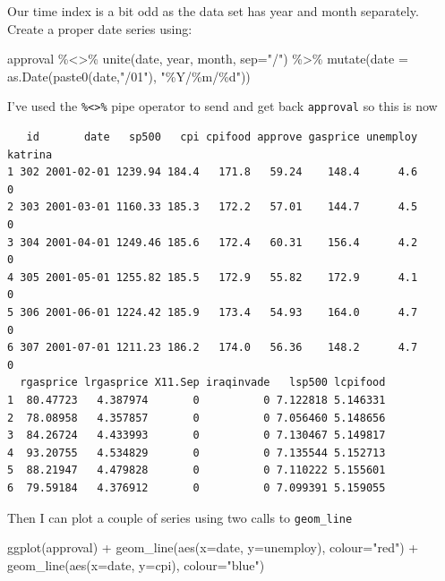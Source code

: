 \documentclass[
  letterpaper,
]{book}
\newenvironment{Shaded}{\begin{snugshade}}{\end{snugshade}}
\newcommand{\AttributeTok}[1]{\textcolor[rgb]{0.40,0.45,0.13}{#1}}
\newcommand{\FunctionTok}[1]{\textcolor[rgb]{0.28,0.35,0.67}{#1}}
\newcommand{\NormalTok}[1]{\textcolor[rgb]{0.00,0.23,0.31}{#1}}
\newcommand{\SpecialCharTok}[1]{\textcolor[rgb]{0.37,0.37,0.37}{#1}}
\newcommand{\StringTok}[1]{\textcolor[rgb]{0.13,0.47,0.30}{#1}}
\begin{document}
Our time index is a bit odd as the data set has year and month
separately. Create a proper date series using:

\begin{Shaded}
\begin{Highlighting}[]
\NormalTok{approval }\SpecialCharTok{\%\textless{}\textgreater{}\%} 
  \FunctionTok{unite}\NormalTok{(date, year, month, }\AttributeTok{sep=}\StringTok{"/"}\NormalTok{) }\SpecialCharTok{\%\textgreater{}\%} 
  \FunctionTok{mutate}\NormalTok{(}\AttributeTok{date =} \FunctionTok{as.Date}\NormalTok{(}\FunctionTok{paste0}\NormalTok{(date,}\StringTok{"/01"}\NormalTok{), }\StringTok{"\%Y/\%m/\%d"}\NormalTok{))}
\end{Highlighting}
\end{Shaded}

I've used the \texttt{\%\textless{}\textgreater{}\%} pipe operator to
send and get back \texttt{approval} so this is now

\begin{verbatim}
   id       date   sp500   cpi cpifood approve gasprice unemploy katrina
1 302 2001-02-01 1239.94 184.4   171.8   59.24    148.4      4.6       0
2 303 2001-03-01 1160.33 185.3   172.2   57.01    144.7      4.5       0
3 304 2001-04-01 1249.46 185.6   172.4   60.31    156.4      4.2       0
4 305 2001-05-01 1255.82 185.5   172.9   55.82    172.9      4.1       0
5 306 2001-06-01 1224.42 185.9   173.4   54.93    164.0      4.7       0
6 307 2001-07-01 1211.23 186.2   174.0   56.36    148.2      4.7       0
  rgasprice lrgasprice X11.Sep iraqinvade   lsp500 lcpifood
1  80.47723   4.387974       0          0 7.122818 5.146331
2  78.08958   4.357857       0          0 7.056460 5.148656
3  84.26724   4.433993       0          0 7.130467 5.149817
4  93.20755   4.534829       0          0 7.135544 5.152713
5  88.21947   4.479828       0          0 7.110222 5.155601
6  79.59184   4.376912       0          0 7.099391 5.159055
\end{verbatim}

Then I can plot a couple of series using two calls to
\texttt{geom\_line}

\begin{Shaded}
\begin{Highlighting}[]
\FunctionTok{ggplot}\NormalTok{(approval) }\SpecialCharTok{+}
  \FunctionTok{geom\_line}\NormalTok{(}\FunctionTok{aes}\NormalTok{(}\AttributeTok{x=}\NormalTok{date, }\AttributeTok{y=}\NormalTok{unemploy), }\AttributeTok{colour=}\StringTok{"red"}\NormalTok{) }\SpecialCharTok{+}
  \FunctionTok{geom\_line}\NormalTok{(}\FunctionTok{aes}\NormalTok{(}\AttributeTok{x=}\NormalTok{date, }\AttributeTok{y=}\NormalTok{cpi), }\AttributeTok{colour=}\StringTok{"blue"}\NormalTok{) }
\end{Highlighting}
\end{Shaded}
\end{document}
